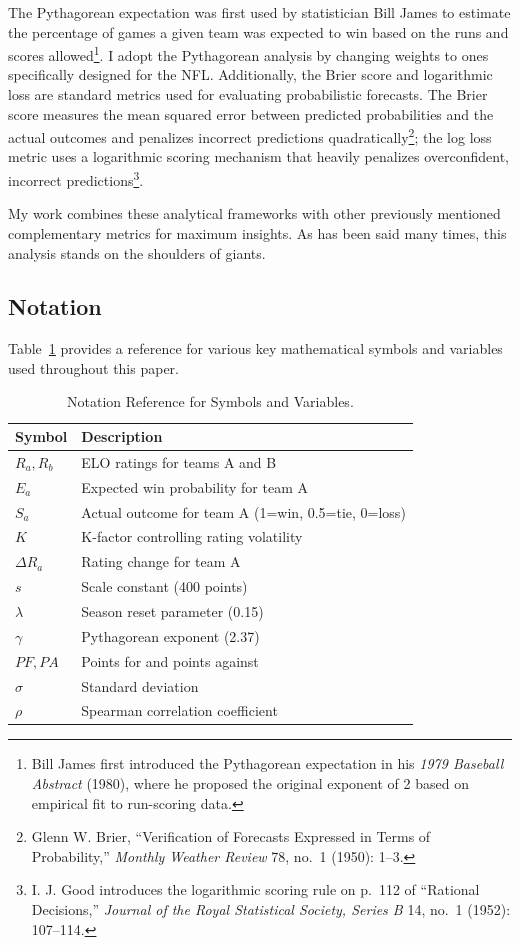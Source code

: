 \documentclass[a4paper,10.5pt,twoside]{article}
\begin{document}
The Pythagorean expectation was first used by statistician Bill James to estimate the percentage of games a given team was expected to win based on the runs and scores allowed\footnote{Bill James first introduced the Pythagorean expectation in his \textit{1979 Baseball Abstract} (1980), where he proposed the original exponent of 2 based on empirical fit to run-scoring data.}. I adopt the Pythagorean analysis by changing weights to ones specifically designed for the NFL.
Additionally, the Brier score and logarithmic loss are standard metrics used for evaluating probabilistic forecasts. The Brier score measures the mean squared error between predicted probabilities and the actual outcomes and penalizes incorrect predictions quadratically\footnote{Glenn W. Brier, “Verification of Forecasts Expressed in Terms of Probability,” \textit{Monthly Weather Review} 78, no.\ 1 (1950): 1--3.}; the log loss metric uses a logarithmic scoring mechanism that heavily penalizes overconfident, incorrect predictions\footnote{I. J. Good introduces the logarithmic scoring rule on p.~112 of “Rational Decisions,” \textit{Journal of the Royal Statistical Society, Series B} 14, no.~1 (1952): 107--114.}.


My work combines these analytical frameworks with other previously mentioned complementary metrics for maximum insights. As has been said many times, this analysis stands on the shoulders of giants.


\subsection{Notation}

Table~\ref{tab:notation} provides a reference for various key mathematical symbols and variables used throughout this paper.

\begin{table}[h]
\centering
\caption{Notation Reference for Symbols and Variables.}
\label{tab:notation}
\begin{tabular}{ll}
\hline
Symbol & Description \\
\hline
$R_a, R_b$ & ELO ratings for teams A and B \\
$E_a$ & Expected win probability for team A \\
$S_a$ & Actual outcome for team A (1=win, 0.5=tie, 0=loss) \\
$K$ & K-factor controlling rating volatility \\
$\Delta R_a$ & Rating change for team A \\
$s$ & Scale constant (400 points) \\
$\lambda$ & Season reset parameter (0.15) \\
$\gamma$ & Pythagorean exponent (2.37) \\
$PF, PA$ & Points for and points against \\
$\sigma$ & Standard deviation \\
$\rho$ & Spearman correlation coefficient \\
\hline
\end{tabular}
\end{table}
\newpage
\end{document}
